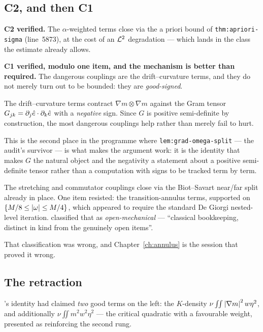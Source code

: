 \subsection{C2, and then C1}

\textbf{C2 verified.} The \(\alpha\)-weighted terms close via the a priori
bound of \texttt{thm:apriori-sigma} (line~5873), at the cost of an
\(\mathcal{L}^2\) degradation --- which lands in the class the estimate already
allows.

\textbf{C1 verified, modulo one item, and the mechanism is better than
required.} The dangerous couplings are the drift--curvature terms, and they do
not merely turn out to be bounded: they are \emph{good-signed}.

\begin{statement}
\label{st:gram}
\PROVED{} The drift--curvature terms contract \(\nabla m\otimes\nabla m\)
against the Gram tensor \(G_{jk}=\partial_j\hat{e}\cdot\partial_k\hat{e}\) with a
\emph{negative} sign. Since \(G\) is positive semi-definite by construction,
the most dangerous couplings help rather than merely fail to hurt.
\end{statement}

This is the second place in the programme where
\texttt{lem:grad-omega-split} --- the audit's survivor --- is what makes the
argument work: it is the identity that makes \(G\) the natural object and the
negativity a statement about a positive semi-definite tensor rather than a
computation with signs to be tracked term by term.

The stretching and commutator couplings close via the Biot--Savart near/far
split already in place. One item resisted: the transition-annulus terms,
supported on \(\{M/8\le\left|\omega\right|\le M/4\}\), which appeared to require the
standard De Giorgi nested-level iteration.  classified that as
\emph{open-mechanical} --- ``classical bookkeeping, distinct in kind from the
genuinely open items''.

That classification was wrong, and Chapter~\ref{ch:annulus} is the session
that proved it wrong.

\subsection{The retraction}

's identity had claimed \emph{two} good terms on the left: the
\(K\)-density \(\nu\iint\left|\nabla m\right|^2w\eta^2\), and additionally
\(\nu\iint m^2w^2\eta^2\) --- the critical quadratic with a favourable weight,
presented as reinforcing the second rung.

